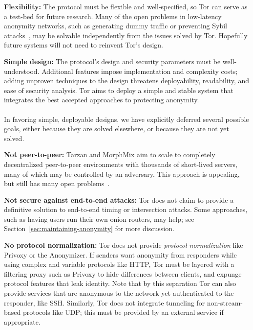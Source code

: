 \documentclass[twocolumn]{article}
\begin{document}
\textbf{Flexibility:} The protocol must be flexible and well-specified,
so Tor can serve as a test-bed for future research.
Many of the open problems in low-latency anonymity
networks, such as generating dummy traffic or preventing Sybil
attacks~\cite{sybil}, may be solvable independently from the issues
solved by
Tor. Hopefully future systems will not need to reinvent Tor's design.

\textbf{Simple design:} The protocol's design and security
parameters must be well-understood. Additional features impose implementation
and complexity costs; adding unproven techniques to the design threatens
deployability, readability, and ease of security analysis. Tor aims to
deploy a simple and stable system that integrates the best accepted
approaches to protecting anonymity.\\

\label{subsec:non-goals}\\
In favoring simple, deployable designs, we have explicitly deferred
several possible goals, either because they are solved elsewhere, or because
they are not yet solved.

\textbf{Not peer-to-peer:} Tarzan and MorphMix aim to scale to completely
decentralized peer-to-peer environments with thousands of short-lived
servers, many of which may be controlled by an adversary.  This approach
is appealing, but still has many open
problems~\cite{tarzan:ccs02,morphmix:fc04}.

\textbf{Not secure against end-to-end attacks:} Tor does not claim
to provide a definitive solution to end-to-end timing or intersection
attacks. Some approaches, such as having users run their own onion routers, 
may help;
see Section~\ref{sec:maintaining-anonymity} for more discussion.

\textbf{No protocol normalization:} Tor does not provide \emph{protocol
normalization} like Privoxy or the Anonymizer. If senders want anonymity from
responders while using complex and variable
protocols like HTTP, Tor must be layered with a filtering proxy such
as Privoxy to hide differences between clients, and expunge protocol
features that leak identity.
Note that by this separation Tor can also provide services that
are anonymous to the network yet authenticated to the responder, like
SSH. Similarly, Tor does not integrate
tunneling for non-stream-based protocols like UDP; this must be
provided by an external service if appropriate.
\end{document}
